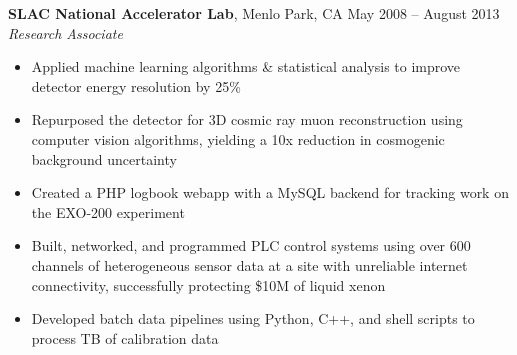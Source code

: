 \documentclass[margin,line]{resume}
\begin{document}
\begin{resume}

    \textbf{SLAC National Accelerator Lab}, Menlo Park, CA \hfill May 2008 -- August 2013\vspace{1mm}\\\vspace{1mm}%
    \textsl{Research Associate}
    \begin{itemize}
    \item Applied machine learning algorithms \& statistical analysis to improve detector energy resolution by 25\%
    \item Repurposed the detector for 3D cosmic ray muon reconstruction using computer vision algorithms, yielding a 10x reduction in cosmogenic background uncertainty
    \item Created a PHP logbook webapp with a MySQL backend for tracking work on the EXO-200 experiment
    \item Built, networked, and programmed PLC control systems using over 600 channels of heterogeneous sensor data at a site with unreliable internet connectivity, successfully protecting \$10M of liquid xenon
    \item Developed batch data pipelines using Python, C++, and shell scripts to process TB of calibration data
    \end{itemize}



\end{resume}
\end{document}
